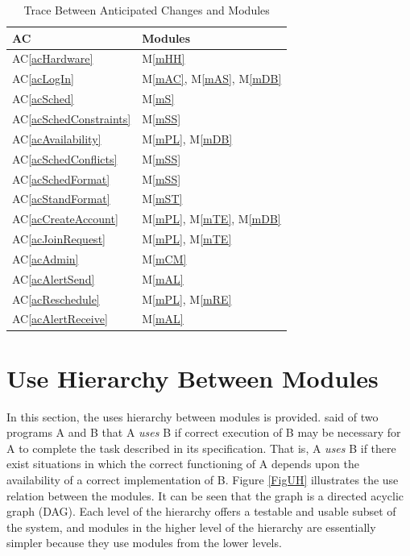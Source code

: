 \documentclass[12pt, titlepage]{article}
\newcommand{\acref}[1]{AC\ref{#1}}
\newcommand{\mref}[1]{M\ref{#1}}
\begin{document}
\begin{table}[H]
\centering
\begin{tabular}{p{} p{}}
\toprule
\textbf{AC} & \textbf{Modules}\\
\midrule
\acref{acHardware} & \mref{mHH}\\
\acref{acLogIn} & \mref{mAC}, \mref{mAS}, \mref{mDB}\\
\acref{acSched} & \mref{mS}\\
\acref{acSchedConstraints} & \mref{mSS}\\
\acref{acAvailability} & \mref{mPL}, \mref{mDB}\\
\acref{acSchedConflicts} & \mref{mSS}\\
\acref{acSchedFormat} & \mref{mSS}\\
\acref{acStandFormat} & \mref{mST}\\
\acref{acCreateAccount} & \mref{mPL}, \mref{mTE}, \mref{mDB}\\
\acref{acJoinRequest} & \mref{mPL}, \mref{mTE}\\
\acref{acAdmin} & \mref{mCM}\\
\acref{acAlertSend} & \mref{mAL}\\
\acref{acReschedule} & \mref{mPL}, \mref{mRE}\\
\acref{acAlertReceive} & \mref{mAL}\\
\bottomrule
\end{tabular}
\caption{Trace Between Anticipated Changes and Modules}
\label{TblACT}
\end{table}

\section{Use Hierarchy Between Modules} \label{SecUse}

In this section, the uses hierarchy between modules is
provided. \citet{Parnas1978} said of two programs A and B that A {\em uses} B if
correct execution of B may be necessary for A to complete the task described in
its specification. That is, A {\em uses} B if there exist situations in which
the correct functioning of A depends upon the availability of a correct
implementation of B.  Figure \ref{FigUH} illustrates the use relation between
the modules. It can be seen that the graph is a directed acyclic graph
(DAG). Each level of the hierarchy offers a testable and usable subset of the
system, and modules in the higher level of the hierarchy are essentially simpler
because they use modules from the lower levels.
\end{document}
